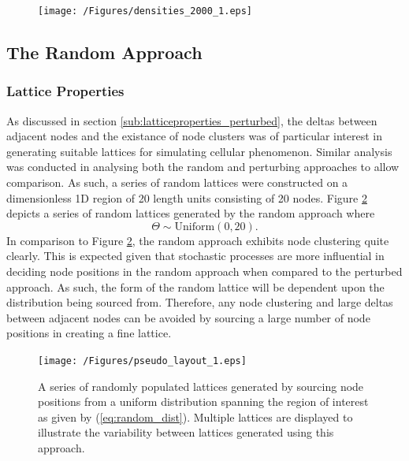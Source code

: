 \documentclass[11pt,a4paper]{article}
\begin{document}
			\begin{figure}[tbh]
				\centering
					\texttt{[image: /Figures/densities\_2000\_1.eps]}
				\caption{}
				\label{fig:densities_2000_1}
			\end{figure}



	\subsection{The Random Approach}
		\label{sub:therandomapproach}
		
		\subsubsection{Lattice Properties}
			\label{subs:latticeproperties_random}
			
			As discussed in section \ref{sub:latticeproperties_perturbed}, the deltas between adjacent nodes and the existance of node clusters was of particular interest in generating suitable lattices for simulating cellular phenomenon. Similar analysis was conducted in analysing both the random and perturbing approaches to allow comparison. As such, a series of random lattices were constructed on a dimensionless 1D region of 20 length units consisting of 20 nodes. Figure \ref{fig:pseudo_layout_1} depicts a series of random lattices generated by the random approach where
			\begin{equation}
				\label{eq:random_dist}
				\Theta \sim \text{Uniform} \left(0, 20\right).	
			\end{equation}
			In comparison to Figure \ref{fig:pseudo_layout_1}, the random approach exhibits node clustering quite clearly. This is expected given that stochastic processes are more influential in deciding node positions in the random approach when compared to the perturbed approach. As such, the form of the random lattice will be dependent upon the distribution being sourced from. Therefore, any node clustering and large deltas between adjacent nodes can be avoided by sourcing a large number of node positions in creating a fine lattice.

			\begin{figure}[tbh]
				\centering
					\texttt{[image: /Figures/pseudo\_layout\_1.eps]}
				\caption{A series of randomly populated lattices generated by sourcing node positions from a uniform distribution spanning the region of interest as given by (\ref{eq:random_dist}). Multiple lattices are displayed to illustrate the variability between lattices generated using this approach.}
				\label{fig:pseudo_layout_1}
			\end{figure}
\end{document}

